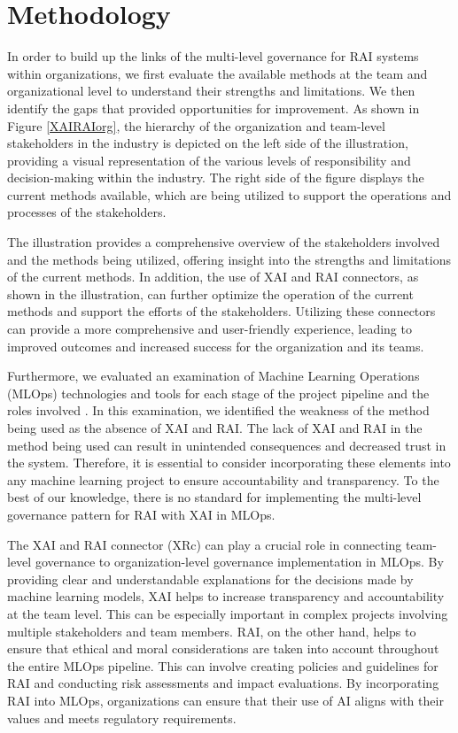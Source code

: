 \documentclass[conference]{IEEEtran}
\begin{document}
\section{Methodology}
In order to build up the links of the multi-level governance for RAI systems within organizations, we first evaluate the available methods at the team and organizational level \cite{catalogue} to understand their strengths and limitations. We then identify the gaps that provided opportunities for improvement. As shown in Figure \ref{XAIRAIorg}, the hierarchy of the organization and team-level stakeholders in the industry is depicted on the left side of the illustration, providing a visual representation of the various levels of responsibility and decision-making within the industry. The right side of the figure displays the current methods available, which are being utilized to support the operations and processes of the stakeholders.

The illustration provides a comprehensive overview of the stakeholders involved and the methods being utilized, offering insight into the strengths and limitations of the current methods. In addition, the use of XAI and RAI connectors, as shown in the illustration, can further optimize the operation of the current methods and support the efforts of the stakeholders. Utilizing these connectors can provide a more comprehensive and user-friendly experience, leading to improved outcomes and increased success for the organization and its teams.

Furthermore, we evaluated an examination of Machine Learning Operations (MLOps) technologies and tools for each stage of the project pipeline and the roles involved \cite{mlops-without}. In this examination, we identified the weakness of the method being used as the absence of XAI and RAI. The lack of XAI and RAI in the method being used can result in unintended consequences and decreased trust in the system. Therefore, it is essential to consider incorporating these elements into any machine learning project to ensure accountability and transparency. To the best of our knowledge, there is no standard for implementing the multi-level governance pattern for RAI with XAI in MLOps.

The XAI and RAI connector (XRc) can play a crucial role in connecting team-level governance to organization-level governance implementation in MLOps. By providing clear and understandable explanations for the decisions made by machine learning models, XAI helps to increase transparency and accountability at the team level. This can be especially important in complex projects involving multiple stakeholders and team members. RAI, on the other hand, helps to ensure that ethical and moral considerations are taken into account throughout the entire MLOps pipeline. This can involve creating policies and guidelines for RAI and conducting risk assessments and impact evaluations. By incorporating RAI into MLOps, organizations can ensure that their use of AI aligns with their values and meets regulatory requirements.
\end{document}
